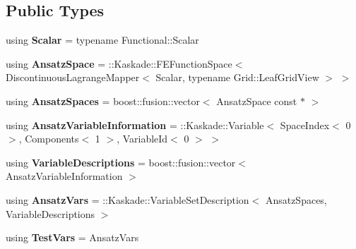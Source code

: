 \subsection*{Public Types}
\begin{DoxyCompactItemize}
\item 
\hypertarget{classSpacy_1_1Kaskade_1_1ErrorDistribution_a151f5d8fc6114ff4b7b0b06549584af2}{}using {\bfseries Scalar} = typename Functional\+::\+Scalar\label{classSpacy_1_1Kaskade_1_1ErrorDistribution_a151f5d8fc6114ff4b7b0b06549584af2}

\item 
\hypertarget{classSpacy_1_1Kaskade_1_1ErrorDistribution_aa7396c03722dd287c0fc935ec99f15b8}{}using {\bfseries Ansatz\+Space} = \+::Kaskade\+::\+F\+E\+Function\+Space$<$ Discontinuous\+Lagrange\+Mapper$<$ Scalar, typename Grid\+::\+Leaf\+Grid\+View $>$ $>$\label{classSpacy_1_1Kaskade_1_1ErrorDistribution_aa7396c03722dd287c0fc935ec99f15b8}

\item 
\hypertarget{classSpacy_1_1Kaskade_1_1ErrorDistribution_a3e1417e1fb71b3a8b7e917b1f68af237}{}using {\bfseries Ansatz\+Spaces} = boost\+::fusion\+::vector$<$ Ansatz\+Space const $\ast$ $>$\label{classSpacy_1_1Kaskade_1_1ErrorDistribution_a3e1417e1fb71b3a8b7e917b1f68af237}

\item 
\hypertarget{classSpacy_1_1Kaskade_1_1ErrorDistribution_ad20840f2ac96c679120fd27078a33a2d}{}using {\bfseries Ansatz\+Variable\+Information} = \+::Kaskade\+::\+Variable$<$ Space\+Index$<$ 0 $>$, Components$<$ 1 $>$, Variable\+Id$<$ 0 $>$ $>$\label{classSpacy_1_1Kaskade_1_1ErrorDistribution_ad20840f2ac96c679120fd27078a33a2d}

\item 
\hypertarget{classSpacy_1_1Kaskade_1_1ErrorDistribution_a368e7e738d712b13476409aaa0984e1a}{}using {\bfseries Variable\+Descriptions} = boost\+::fusion\+::vector$<$ Ansatz\+Variable\+Information $>$\label{classSpacy_1_1Kaskade_1_1ErrorDistribution_a368e7e738d712b13476409aaa0984e1a}

\item 
\hypertarget{classSpacy_1_1Kaskade_1_1ErrorDistribution_a2c752f20145c9948f9b00b5472382c7f}{}using {\bfseries Ansatz\+Vars} = \+::Kaskade\+::\+Variable\+Set\+Description$<$ Ansatz\+Spaces, Variable\+Descriptions $>$\label{classSpacy_1_1Kaskade_1_1ErrorDistribution_a2c752f20145c9948f9b00b5472382c7f}

\item 
\hypertarget{classSpacy_1_1Kaskade_1_1ErrorDistribution_a4e8ecdbc79b38e576213d768a744a5f9}{}using {\bfseries Test\+Vars} = Ansatz\+Vars\label{classSpacy_1_1Kaskade_1_1ErrorDistribution_a4e8ecdbc79b38e576213d768a744a5f9}


\end{DoxyCompactItemize}
